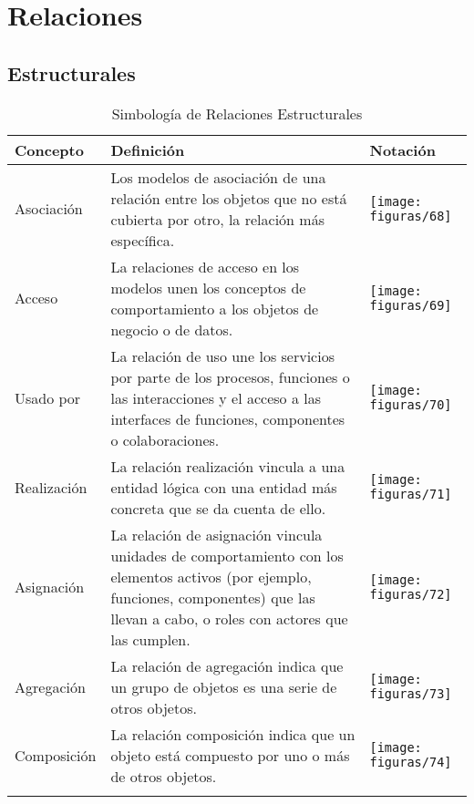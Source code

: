 \section{Relaciones}
  \subsection{Estructurales}
    \begin{longtable}
    	{m{3cm}m{4.8cm}m{5.2cm}}
    	\hline
    	\rowcolor[HTML]{0073a1}
    	{\color[HTML]{FFFFFF} \textbf{Concepto}} & {\color[HTML]{FFFFFF} \textbf{Definición}} & {\color[HTML]{FFFFFF} \textbf{Notación}} \\
    	\hline
    	Asociación & Los modelos de asociación de una relación entre los objetos que no está cubierta por otro, la relación más específica. & \texttt{[image: figuras/68]} \\ \hline
    	Acceso & La relaciones de acceso en los modelos unen los conceptos de comportamiento a los objetos de negocio o de datos. & \texttt{[image: figuras/69]} \\ \hline
    	Usado por & La relación de uso une los servicios por parte de los procesos, funciones o las interacciones y el acceso a las interfaces de funciones, componentes o colaboraciones. & \texttt{[image: figuras/70]} \\ \hline
    	Realización & La relación realización vincula a una entidad lógica con una entidad más concreta que se da cuenta de ello. & \texttt{[image: figuras/71]} \\ \hline
    	Asignación & La relación de asignación vincula unidades de comportamiento con los elementos activos (por ejemplo, funciones, componentes) que las llevan a cabo, o roles con actores que las cumplen. & \texttt{[image: figuras/72]} \\ \hline
    	Agregación & La relación de agregación indica que un grupo de objetos es una serie de otros objetos. & \texttt{[image: figuras/73]} \\ \hline
    	Composición & La relación composición indica que un objeto está compuesto por uno o más de otros objetos. & \texttt{[image: figuras/74]} \\
  	    \bottomrule
    	\captionsetup{width=.95\textwidth}
    	\caption{Simbología de Relaciones Estructurales}
    	\label{tabla32}
    \end{longtable}
    
